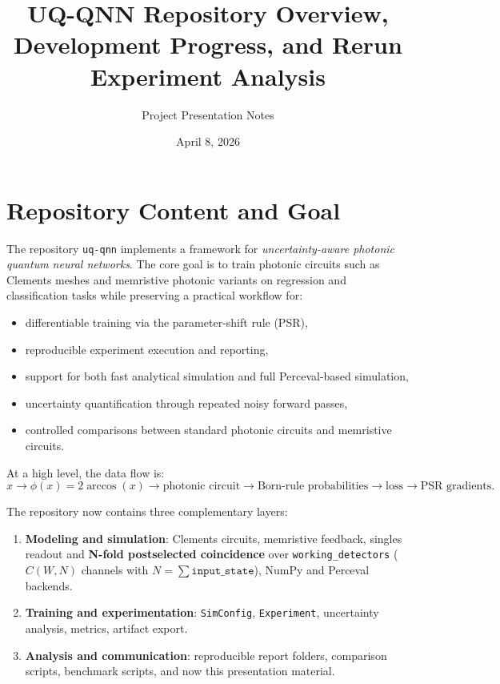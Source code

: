 \documentclass[11pt,a4paper]{article}
\title{UQ-QNN Repository Overview, Development Progress, and Rerun Experiment Analysis}
\author{Project Presentation Notes}
\date{April 8, 2026}
\begin{document}
\maketitle
\tableofcontents
\newpage

\section{Repository Content and Goal}

The repository \texttt{uq-qnn} implements a framework for \emph{uncertainty-aware photonic quantum neural networks}. The core goal is to train photonic circuits such as Clements meshes and memristive photonic variants on regression and classification tasks while preserving a practical workflow for:

\begin{itemize}[leftmargin=*]
    \item differentiable training via the parameter-shift rule (PSR),
    \item reproducible experiment execution and reporting,
    \item support for both fast analytical simulation and full Perceval-based simulation,
    \item uncertainty quantification through repeated noisy forward passes,
    \item controlled comparisons between standard photonic circuits and memristive circuits.
\end{itemize}

At a high level, the data flow is:
\[
    x \rightarrow \phi(x)=2\arccos(x) \rightarrow \text{photonic circuit} \rightarrow \text{Born-rule probabilities} \rightarrow \text{loss} \rightarrow \text{PSR gradients}.
\]

The repository now contains three complementary layers:
\begin{enumerate}[leftmargin=*]
    \item \textbf{Modeling and simulation}: Clements circuits, memristive feedback, singles readout and \textbf{N-fold postselected coincidence} over \texttt{working\_detectors} (\(C(W,N)\) channels with \(N=\sum\texttt{input\_state}\)), NumPy and Perceval backends.
    \item \textbf{Training and experimentation}: \texttt{SimConfig}, \texttt{Experiment}, uncertainty analysis, metrics, artifact export.
    \item \textbf{Analysis and communication}: reproducible report folders, comparison scripts, benchmark scripts, and now this presentation material.
\end{enumerate}
\end{document}
